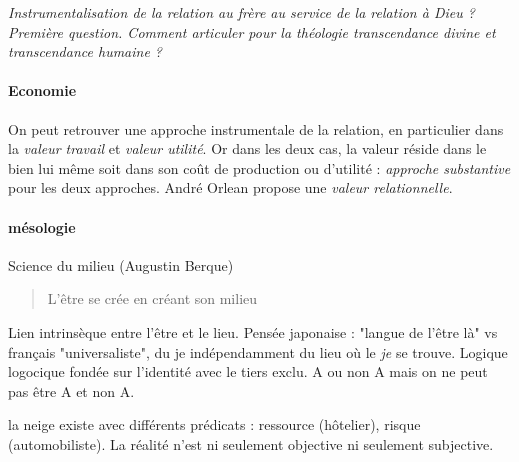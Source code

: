 \textit{{Instrumentalisation de la relation au frère au service de la relation à Dieu ?} Première question. Comment articuler pour la théologie transcendance divine et transcendance humaine ?
}
\paragraph{Economie} On peut retrouver une approche instrumentale de la relation, en particulier dans la \textit{valeur travail} et \textit{valeur utilité}. Or dans les deux cas, la valeur réside dans le bien lui même soit dans son coût de production ou d'utilité : \textit{approche substantive} pour les deux approches. André Orlean propose une \textit{valeur relationnelle}. 

\paragraph{mésologie}

\begin{Def}[mésologie]
    Science du milieu (Augustin Berque)
\end{Def}
\begin{quote}
    L'être se crée en créant son milieu 
\end{quote}
Lien intrinsèque entre l'être et le lieu. Pensée japonaise : "langue de l'être là" vs français "universaliste", du je indépendamment du lieu où le \textit{je } se trouve. Logique logocique fondée sur l'identité avec le tiers exclu. A ou non A mais on ne peut pas être A et non A. 
\begin{Ex}[neige]
    la neige existe avec différents prédicats : ressource (hôtelier), risque (automobiliste).
    La réalité n'est ni seulement objective ni seulement subjective.
\end{Ex}

